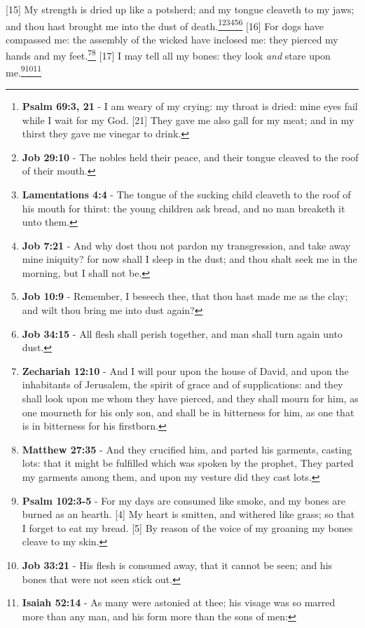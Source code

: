 [15] \textcolor[cmyk]{0.99998,1,0,0}{My strength is dried up like a potsherd; and my tongue cleaveth to my jaws; and thou hast brought me into the dust of death.}\footnote{\textbf{Psalm 69:3, 21} - I am weary of my crying: my throat is dried: mine eyes fail while I wait for my God. [21] They gave me also gall for my meat; and in my thirst they gave me vinegar to drink.}\footnote{\textbf{Job 29:10} - The nobles held their peace, and their tongue cleaved to the roof of their mouth.}\footnote{\textbf{Lamentations 4:4} - The tongue of the sucking child cleaveth to the roof of his mouth for thirst: the young children ask bread, and no man breaketh it unto them.}\footnote{\textbf{Job 7:21} - And why dost thou not pardon my transgression, and take away mine iniquity? for now shall I sleep in the dust; and thou shalt seek me in the morning, but I shall not be.}\footnote{\textbf{Job 10:9} -  Remember, I beseech thee, that thou hast made me as the clay; and wilt thou bring me into dust again?}\footnote{\textbf{Job 34:15} - All flesh shall perish together, and man shall turn again unto dust.}
[16] \textcolor[cmyk]{0.99998,1,0,0}{For dogs have compassed me: the assembly of the wicked have inclosed me: they pierced my hands and my feet.}\footnote{\textbf{Zechariah 12:10} - And I will pour upon the house of David, and upon the inhabitants of Jerusalem, the spirit of grace and of supplications: and they shall look upon me whom they have pierced, and they shall mourn for him, as one mourneth for his only son, and shall be in bitterness for him, as one that is in bitterness for his firstborn.}\footnote{\textbf{Matthew 27:35} - And they crucified him, and parted his garments, casting lots: that it might be fulfilled which was spoken by the prophet, They parted my garments among them, and upon my vesture did they cast lots.}
[17] \textcolor[cmyk]{0.99998,1,0,0}{I may tell all my bones: they look \emph{and} stare upon me.}\footnote{\textbf{Psalm 102:3-5} - For my days are consumed like smoke, and my bones are burned as an hearth. [4] My heart is smitten, and withered like grass; so that I forget to eat my bread. [5] By reason of the voice of my groaning my bones cleave to my skin.}\footnote{\textbf{Job 33:21} - His flesh is consumed away, that it cannot be seen; and his bones that were not seen stick out.}\footnote{\textbf{Isaiah 52:14} - As many were astonied at thee; his visage was so marred more than any man, and his form more than the sons of men:}

